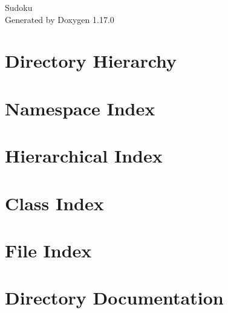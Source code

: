 \documentclass[twoside]{book}
\newcommand{\+}{\discretionary{\mbox{\scriptsize$\hookleftarrow$}}{}{}}
\newcommand{\clearemptydoublepage}{%
    \newpage{\pagestyle{empty}\cleardoublepage}%
  }
\begin{document}
  \raggedbottom
    \hypersetup{pageanchor=false,
                bookmarksnumbered=true,
                pdfencoding=unicode
               }
  \begin{titlepage}
  \vspace*{7cm}
  \begin{center}%
  {\Large Sudoku}\\
  \vspace*{1cm}
  {\large Generated by Doxygen 1.17.0}\\
  \end{center}
  \end{titlepage}
  \clearemptydoublepage
  \tableofcontents
  \clearemptydoublepage
  \hypersetup{pageanchor=true}
\chapter{Directory Hierarchy}

\chapter{Namespace Index}

\chapter{Hierarchical Index}

\chapter{Class Index}

\chapter{File Index}

\chapter{Directory Documentation}
















\end{document}
